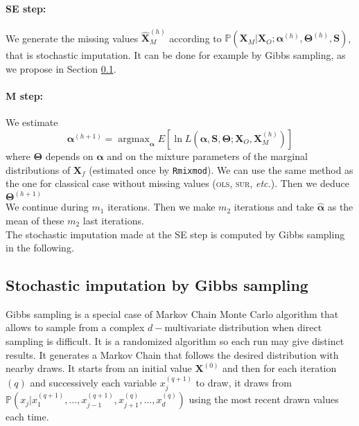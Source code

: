 \documentclass[12pt,a4paper]{report}
\begin{document}
	\paragraph{SE step:}
		We generate the missing values $\hat{\boldsymbol{X}}_M^{(h)}$ according to $\mathbb{P}(\boldsymbol{X}_M|\boldsymbol{X}_O; \boldsymbol{\alpha}^{(h)},\boldsymbol{\Theta}^{(h)},\boldsymbol{S})$, that is stochastic imputation. It can be done for example by Gibbs sampling, as we propose in Section \ref{gibbsmiss}.
	\paragraph{M step:}
		We estimate 
		\begin{equation}
	\boldsymbol{\alpha}^{(h+1)}=\operatorname{argmax}_{\boldsymbol{\alpha}}E\left[\ln L(\boldsymbol{\alpha},\boldsymbol{S},\boldsymbol{\Theta};\boldsymbol{X}_O,\boldsymbol{X}_M^{(h)}) \right]  \nonumber 
\end{equation}
where $\boldsymbol{\Theta}$ depends on $\boldsymbol{\alpha}$ and on the mixture parameters of the marginal distributions of $\boldsymbol{X}_f$ (estimated once by {\tt Rmixmod}). We can use the same method as the one for classical case without missing values (\textsc{ols}, \textsc{sur}, {\it etc.}). Then we deduce $\boldsymbol{\Theta}^{(h+1)}$ \\

		We continue during $m_1$ iterations. Then we make $m_2$ iterations and take $\hat{\boldsymbol{\alpha}}$ as the mean of these $m_2$ last iterations.\\
		
	The stochastic imputation made at the SE step is computed by Gibbs sampling in the following.

	\subsection{Stochastic imputation by Gibbs sampling}\label{gibbsmiss}
		Gibbs sampling \cite{casella1992explaining} is a special case of Markov Chain Monte Carlo algorithm \cite{gilks1996markov,chib1995understanding,roberts2001optimal} that allows to sample from a complex $d-$multivariate distribution when direct sampling is difficult. It is a randomized algorithm so each run may give distinct results. It generates a Markov Chain that follows the desired distribution with nearby draws. It starts from an initial value $\boldsymbol{X}^{(0)}$ and then for each iteration $(q)$ and successively each variable $x_j^{(q+1)}$ to draw, it draws from $\mathbb{P}(x_j|x_1^{(q+1)}, \dots,x_{j-1}^{(q+1)},x_{j+1}^{(q)},\dots,x_d^{(q)})$ using the most recent drawn values each time. \\
		
\end{document}
